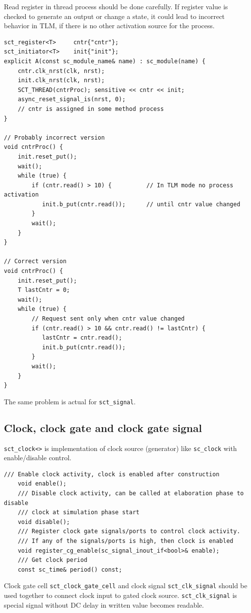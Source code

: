 Read register in thread process should be done carefully. If register value is checked to generate an output or change a state, it could lead to incorrect behavior in TLM, if there is no other activation source for the process. 
\begin{lstlisting}[style=mycpp]
sct_register<T>     cntr{"cntr"};
sct_initiator<T>    init{"init"};
explicit A(const sc_module_name& name) : sc_module(name) {
    cntr.clk_nrst(clk, nrst);
    init.clk_nrst(clk, nrst);
    SCT_THREAD(cntrProc); sensitive << cntr << init;
    async_reset_signal_is(nrst, 0);
    // cntr is assigned in some method process 
}

// Probably incorrect version
void cntrProc() {
    init.reset_put();
    wait();
    while (true) {
        if (cntr.read() > 10) {          // In TLM mode no process activation 
           init.b_put(cntr.read());      // until cntr value changed
        }
        wait();
    }
}

// Correct version
void cntrProc() {
    init.reset_put();
    T lastCntr = 0;
    wait();
    while (true) {
        // Request sent only when cntr value changed  
        if (cntr.read() > 10 && cntr.read() != lastCntr) {
           lastCntr = cntr.read();       
           init.b_put(cntr.read());     
        }
        wait();
    }
}
\end{lstlisting}
The same problem is actual for {\tt sct\_signal}.

\subsection{Clock, clock gate and clock gate signal}

{\tt sct\_clock<>} is implementation of clock source (generator) like {\tt sc\_clock} with enable/disable control.

\begin{lstlisting}[style=mycpp]
    /// Enable clock activity, clock is enabled after construction 
    void enable();   
    /// Disable clock activity, can be called at elaboration phase to disable
    /// clock at simulation phase start
    void disable();    
    /// Register clock gate signals/ports to control clock activity.
    /// If any of the signals/ports is high, then clock is enabled
    void register_cg_enable(sc_signal_inout_if<bool>& enable);
    /// Get clock period    
    const sc_time& period() const;
\end{lstlisting}

Clock gate cell {\tt sct\_clock\_gate\_cell} and clock signal {\tt sct\_clk\_signal} should be used together to connect clock input to gated clock source. {\tt sct\_clk\_signal} is special signal without DC delay in written value becomes readable.

